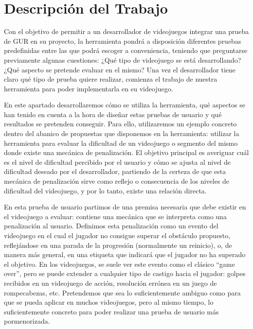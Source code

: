 \chapter{Descripción del Trabajo}
\label{cap:descripcionTrabajo}
Con el objetivo de permitir a un desarrollador de videojuegos integrar una prueba de GUR en su proyecto, la herramienta pondrá a disposición diferentes pruebas predefinidas entre las que podrá escoger a conveniencia, teniendo que preguntarse previamente algunas cuestiones:  ¿Qué tipo de videojuego se está desarrollando? ¿Qué aspecto se pretende evaluar en el mismo? Una vez el desarrollador tiene claro qué tipo de prueba quiere realizar, comienza el trabajo de nuestra herramienta para poder implementarla en su videojuego.

En este apartado desarrollaremos cómo se utiliza la herramienta, qué aspectos se han tenido en cuenta a la hora de diseñar estas pruebas de usuario y qué resultados se pretenden conseguir. Para ello, utilizaremos un ejemplo concreto dentro del abanico de propuestas que disponemos en la herramienta: utilizar la herramienta para evaluar la dificultad de un videojuego o segmento del mismo donde existe una mecánica de penalización. El objetivo principal es averiguar cuál es el nivel de dificultad percibido por el usuario y cómo se ajusta al nivel de dificultad deseado por el desarrollador, partiendo de la certeza de que esta mecánica de penalización sirve como reflejo o consecuencia de los niveles de dificultad del videojuego, y por lo tanto, existe una relación directa.

En esta prueba de usuario partimos de una premisa necesaria que debe existir en el videojuego a evaluar: contiene una mecánica que se interpreta como una penalización al usuario. Definimos esta penalización como un evento del videojuego en el cual el jugador no consigue superar el obstáculo propuesto, reflejándose en una parada de la progresión (normalmente un reinicio), o, de manera más general, en una etiqueta que indicará que el jugador no ha superado el objetivo. En los videojuegos, se suele ver este evento como el clásico “game over”, pero se puede extender a cualquier tipo de castigo hacia el jugador: golpes recibidos en un videojuego de acción, resolución errónea en un juego de rompecabezas, etc. Pretendemos que sea lo suficientemente ambiguo como para que se pueda aplicar en muchos videojuegos, pero al mismo tiempo, lo suficientemente concreto para poder realizar una prueba de usuario más pormenorizada. 

